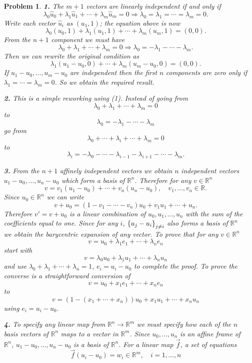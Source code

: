\documentclass{article}
\newcommand{\subno}[1]{\par\noindent\textbf{#1}}
\newcommand{\R}{\mathbb{R}}
\theoremstyle{pprop}
\newtheorem{problem}{Problem}[section]
\begin{document}
\begin{problem}
\subno{1.} The $m+1$ vectors are linearly independent if and only if
\[
\lambda_0 \hat{u}_0 + \lambda_1 \hat{u}_1 + \cdots + \lambda_m \hat{u}_m = 0 \Rightarrow \lambda_0=\lambda_1=\cdots=\lambda_m=0.
\]    
Write each vector $\hat{u}_i$ as $(u_1,1)$; the equation above is now  
\[
\lambda_0 ({u}_0,1) + \lambda_1 ({u}_1,1) + \cdots + \lambda_m ({u}_m,1) = (0,0).
\]
From the $n+1$ component we must have
\[
\lambda_0 + \lambda_1 + \cdots + \lambda_m = 0 \Rightarrow \lambda_0 = -\lambda_1 - \cdots - \lambda_m.
\]
Then we can rewrite the original condition as 
\[
\lambda_1 ({u}_1-u_{0},0) + \cdots + \lambda_m ({u}_m-u_0,0) = (0,0).
\]
If $u_1-u_0,\ldots,u_m-u_0$ are independent then the first $n$ components are zero only if 
$\lambda_1=\cdots=\lambda_m=0$. So we obtain the required result.
\subno{2.} This is a simple reworking using (1). Instead of going from 
\[
\lambda_0 + \lambda_1 + \cdots + \lambda_m = 0
\]
to
\[
\lambda_0 = -\lambda_1 - \cdots - \lambda_m
\]
go from 
\[
\lambda_0 + \cdots + \lambda_i + \cdots + \lambda_m = 0
\]
to 
\[
\lambda_i = - \lambda_0 - \cdots - \lambda_{i-1} - \lambda_{i+1} - \cdots - \lambda_m.
\]
\subno{3.} From the $n+1$ affinely independent vectors we obtain $n$ independent vectors 
$u_1-u_0,\ldots,u_n-u_0$ which form a basis of $\R^n$. Therefore for any $v \in \R^n$
\[
v = v_1 (u_1-u_0)+ \cdots + v_n (u_n-u_0), \quad v_1,\ldots,v_n \in \R.
\]
Since $u_0 \in \R^n$ we can write 
\[
v + u_0 = (1-v_1 - \cdots - v_n) u_0 + v_1 u_1 + \cdots + u_n. 
\]
Therefore $v'=v+u_0$ is a linear combination of $u_0,u_1,\ldots,u_n$ with the sum of the 
coefficients equal to one. Since for any $i$, $\qty{u_j-u_i}_{j \neq i}$ also forms a basis of $\R^n$
we obtain the barycentric expansion of any vector. To prove that for any $v \in \R^n$ 
\[
v = u_0 + \lambda_1 e_1 + \cdots + \lambda_n e_n
\]
start with  
\[
v = \lambda_0 u_0 + \lambda_1 u_1 + \cdots + \lambda_n u_n
\]
and use $\lambda_0+\lambda_1+\cdots+\lambda_n=1$, $e_i=u_i-u_0$ to complete the proof. To prove the converse is 
a straightforward conversion of 
\[
v = u_0 + x_1 e_1 + \cdots + x_n e_n
\]
to 
\[
v =(1-(x_1+\cdots+x_n)) u_0 + x_1 u_1 + \cdots + x_n u_n
\]
using $e_i=u_i-u_0$.
\subno{4.} To specify any linear map from $\R^n \to \R^m$ we must specify how each of the
$n$ basis vectors of $\R^n$ maps to a vector in $\R^m$. Since $u_0,\ldots,u_n$ is an affine 
frame of $\R^n$, $u_1-u_0,\ldots,u_n-u_0$ is a basis of $\R^n$. For a linear 
map $\vec{f}$, a set of equations 
\[
\vec{f}(u_i-u_0) = w_i \in \R^m, \quad i=1,\ldots,n
\]

\end{problem}
\end{document}
